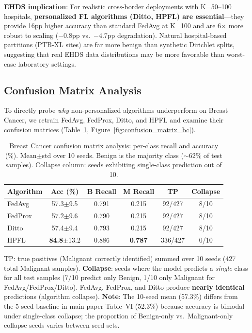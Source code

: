 \documentclass[conference]{IEEEtran}
\begin{document}
\textbf{EHDS implication}: For realistic cross-border deployments with K=50--100 hospitals, \textbf{personalized FL algorithms (Ditto, HPFL) are essential}---they provide 16pp higher accuracy than standard FedAvg at K=100 and are 6$\times$ more robust to scaling ($-$0.8pp vs.\ $-$4.7pp degradation). Natural hospital-based partitions (PTB-XL sites) are far more benign than synthetic Dirichlet splits, suggesting that real EHDS data distributions may be more favorable than worst-case laboratory settings.

\subsection{Confusion Matrix Analysis}
\label{sec:confusion_matrix}

To directly probe \textit{why} non-personalized algorithms underperform on Breast Cancer, we retrain FedAvg, FedProx, Ditto, and HPFL and examine their confusion matrices (Table~\ref{tab:confusion_matrix_bc}, Figure~\ref{fig:confusion_matrix_bc}).

\begin{table}[htbp]
\centering
\caption{Breast Cancer confusion matrix analysis: per-class recall and accuracy (\%). Mean$\pm$std over 10 seeds. Benign is the majority class ($\sim$62\% of test samples). Collapse column: seeds exhibiting single-class prediction out of 10.}
\label{tab:confusion_matrix_bc}
\small
\begin{tabular}{lccccc}
\toprule
\textbf{Algorithm} & \textbf{Acc (\%)} & \textbf{B Recall} & \textbf{M Recall} & \textbf{TP} & \textbf{Collapse} \\
\midrule
FedAvg & 57.3{\tiny$\pm$9.5} & 0.791 & 0.215 & 92/427 & 8/10 \\
FedProx & 57.2{\tiny$\pm$9.6} & 0.790 & 0.215 & 92/427 & 8/10 \\
Ditto & 57.4{\tiny$\pm$9.4} & 0.793 & 0.215 & 92/427 & 8/10 \\
\midrule
HPFL & \textbf{84.8}{\tiny$\pm$13.2} & 0.886 & \textbf{0.787} & 336/427 & 0/10 \\
\bottomrule
\end{tabular}

\vspace{1mm}
\footnotesize{TP: true positives (Malignant correctly identified) summed over 10 seeds (427 total Malignant samples). \textbf{Collapse}: seeds where the model predicts a \textit{single} class for all test samples (7/10 predict only Benign, 1/10 only Malignant for FedAvg/FedProx/Ditto). FedAvg, FedProx, and Ditto produce \textbf{nearly identical} predictions (algorithm collapse). \textbf{Note}: The 10-seed mean (57.3\%) differs from the 5-seed baseline in main paper Table~VI (52.3\%) because accuracy is bimodal under single-class collapse; the proportion of Benign-only vs.\ Malignant-only collapse seeds varies between seed sets.}
\end{table}
\end{document}
